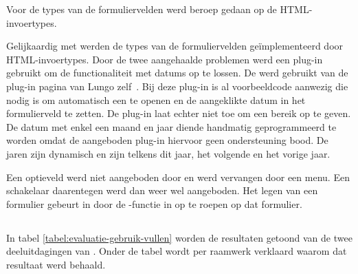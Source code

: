 Voor de types van de formuliervelden werd beroep gedaan op de HTML-invoertypes. 

Gelijkaardig met \jqm{} werden de types van de formuliervelden geïmplementeerd door HTML-invoertypes. 
Door de twee aangehaalde problemen werd een plug-in gebruikt om de functionaliteit met datums op te lossen.
De  werd gebruikt van de plug-in pagina van Lungo zelf~\cite{TapQuo2013b}.
Bij deze plug-in is al voorbeeldcode aanwezig die nodig is om automatisch een  te openen en de aangeklikte datum in het formulierveld te zetten.
De plug-in laat echter niet toe om een bereik op te geven.
De datum met enkel een maand en jaar diende handmatig geprogrammeerd te worden omdat de aangeboden plug-in hiervoor geen ondersteuning bood.
De jaren zijn dynamisch en zijn telkens dit jaar, het volgende en het vorige jaar. 

Een optieveld werd niet aangeboden door \lungo{} en werd vervangen door een menu. 
Een schakelaar daarentegen werd dan weer wel aangeboden.
Het legen van een formulier gebeurt in \lungo{} door de -functie in \js{} op te roepen op dat formulier.


\subsection{}
\label{sec:evaluatie-gebruik-vullen}

In tabel \ref{tabel:evaluatie-gebruik-vullen} worden de resultaten getoond van de twee deeluitdagingen van .
Onder de tabel wordt per raamwerk verklaard waarom dat resultaat werd behaald.

\begin{table}
\centering
{}
\caption{Gebruik van .}
\label{tabel:evaluatie-gebruik-vullen}
\end{table}

